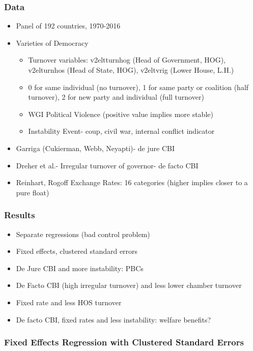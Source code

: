 \documentclass{beamer}
\begin{document}
    \begin{frame}
        \frametitle{Data}
        \begin{itemize}
            \item Panel of 192 countries, 1970-2016
            \item Varieties of Democracy
            \begin{itemize}
                \item Turnover variables: v2eltturnhog (Head of Government, HOG), v2elturnhos (Head of State, HOG), v2eltvrig (Lower House, L.H.)
                \item 0 for same individual (no turnover), 1 for same party or coalition (half turnover), 2 for new party and individual (full turnover)
                \item WGI Political Violence (positive value implies more stable)
                \item Instability Event- coup, civil war, internal conflict indicator
            \end{itemize}
            \item Garriga (Cukierman, Webb, Neyapti)- de jure CBI
            \item Dreher et al.- Irregular turnover of governor- de facto CBI
            \item Reinhart, Rogoff Exchange Rates: 16 categories (higher implies closer to a pure float)
        \end{itemize}
    \end{frame}

    \begin{frame}
        \frametitle{Results}
        \begin{itemize}
            \item Separate regressions (bad control problem)
            \item Fixed effects, clustered standard errors
            \item De Jure CBI and more instability: PBCs
            \item De Facto CBI (high irregular turnover) and less lower chamber turnover
            \item Fixed rate and less HOS turnover
            \item De facto CBI, fixed rates and less instability: welfare benefits?
        \end{itemize}
    \end{frame}

    \begin{frame}
        \frametitle{Fixed Effects Regression with Clustered Standard Errors}
        {
            \let\oldcentering\centering
            \renewcommand\centering{\tiny\oldcentering}
            
        }
    \end{frame}
\end{document}
